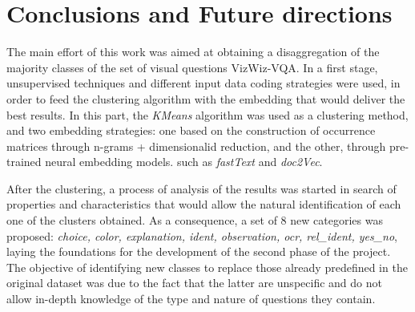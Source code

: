 \section{Conclusions and Future directions}
The main effort of this work was aimed at obtaining a disaggregation of the majority classes of the set of visual questions VizWiz-VQA.
In a first stage, unsupervised techniques and different input data coding strategies were used, in order to feed the clustering algorithm with the embedding that would deliver the best results. In this part, the \emph{KMeans} algorithm was used as a clustering method, and two embedding strategies: one based on the construction of occurrence matrices through n-grams + dimensionalid reduction, and the other, through pre-trained neural embedding models. such as \emph{fastText} and \emph{doc2Vec}.

After the clustering, a process of analysis of the results was started in search of properties and characteristics that would allow the natural identification of each one of the clusters obtained. As a consequence, a set of 8 new categories was proposed: \emph{choice, color, explanation, ident, observation, ocr, rel\_ident, yes\_no}, laying the foundations for the development of the second phase of the project. The objective of identifying new classes to replace those already predefined in the original dataset was due to the fact that the latter are unspecific and do not allow in-depth knowledge of the type and nature of questions they contain.

